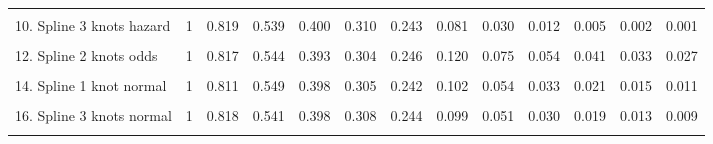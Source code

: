 \documentclass[
]{article}
\begin{document}
\begin{table}
{\begin{tabular}[t]{lrrrrrrrrrrrr}
\cellcolor{gray!6}{9. Spline 2 knots hazard} & \cellcolor{gray!6}{1} & \cellcolor{gray!6}{0.817} & \cellcolor{gray!6}{0.545} & \cellcolor{gray!6}{0.396} & \cellcolor{gray!6}{0.305} & \cellcolor{gray!6}{0.243} & \cellcolor{gray!6}{0.096} & \cellcolor{gray!6}{0.043} & \cellcolor{gray!6}{0.021} & \cellcolor{gray!6}{0.010} & \cellcolor{gray!6}{0.005} & \cellcolor{gray!6}{0.003}\\
10. Spline 3 knots hazard & 1 & 0.819 & 0.539 & 0.400 & 0.310 & 0.243 & 0.081 & 0.030 & 0.012 & 0.005 & 0.002 & 0.001\\
\cellcolor{gray!6}{11. Spline 1 knot odds} & \cellcolor{gray!6}{1} & \cellcolor{gray!6}{0.820} & \cellcolor{gray!6}{0.542} & \cellcolor{gray!6}{0.390} & \cellcolor{gray!6}{0.303} & \cellcolor{gray!6}{0.248} & \cellcolor{gray!6}{0.127} & \cellcolor{gray!6}{0.082} & \cellcolor{gray!6}{0.060} & \cellcolor{gray!6}{0.047} & \cellcolor{gray!6}{0.038} & \cellcolor{gray!6}{0.032}\\
12. Spline 2 knots odds & 1 & 0.817 & 0.544 & 0.393 & 0.304 & 0.246 & 0.120 & 0.075 & 0.054 & 0.041 & 0.033 & 0.027\\
\cellcolor{gray!6}{13. Spline 3 knots odds} & \cellcolor{gray!6}{1} & \cellcolor{gray!6}{0.818} & \cellcolor{gray!6}{0.542} & \cellcolor{gray!6}{0.398} & \cellcolor{gray!6}{0.308} & \cellcolor{gray!6}{0.246} & \cellcolor{gray!6}{0.110} & \cellcolor{gray!6}{0.066} & \cellcolor{gray!6}{0.045} & \cellcolor{gray!6}{0.033} & \cellcolor{gray!6}{0.026} & \cellcolor{gray!6}{0.021}\\
14. Spline 1 knot normal & 1 & 0.811 & 0.549 & 0.398 & 0.305 & 0.242 & 0.102 & 0.054 & 0.033 & 0.021 & 0.015 & 0.011\\
\cellcolor{gray!6}{15. Spline 2 knots normal} & \cellcolor{gray!6}{1} & \cellcolor{gray!6}{0.815} & \cellcolor{gray!6}{0.546} & \cellcolor{gray!6}{0.392} & \cellcolor{gray!6}{0.303} & \cellcolor{gray!6}{0.245} & \cellcolor{gray!6}{0.113} & \cellcolor{gray!6}{0.065} & \cellcolor{gray!6}{0.042} & \cellcolor{gray!6}{0.029} & \cellcolor{gray!6}{0.021} & \cellcolor{gray!6}{0.016}\\
16. Spline 3 knots normal & 1 & 0.818 & 0.541 & 0.398 & 0.308 & 0.244 & 0.099 & 0.051 & 0.030 & 0.019 & 0.013 & 0.009\\
\cellcolor{gray!6}{17. Mixture cure Weibull} & \cellcolor{gray!6}{1} & \cellcolor{gray!6}{0.819} & \cellcolor{gray!6}{0.585} & \cellcolor{gray!6}{0.403} & \cellcolor{gray!6}{0.290} & \cellcolor{gray!6}{0.229} & \cellcolor{gray!6}{0.179} & \cellcolor{gray!6}{0.179} & \cellcolor{gray!6}{0.179} & \cellcolor{gray!6}{0.179} & \cellcolor{gray!6}{0.179} & \cellcolor{gray!6}{0.179}\\

\end{tabular}}
\end{table}
\end{document}
